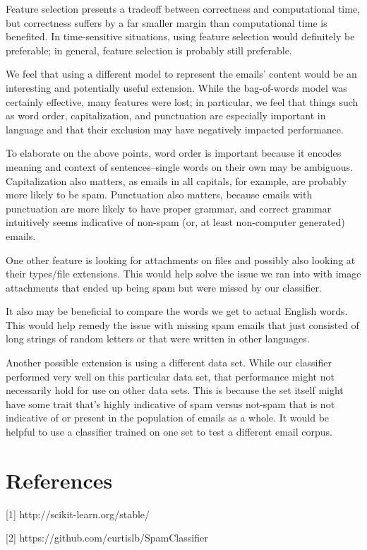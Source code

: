 \documentclass{article} %
\begin{document}
Feature selection presents a tradeoff between correctness and computational time, but correctness suffers by a far smaller margin than computational time is benefited. In time-sensitive situations, using feature selection would definitely be preferable; in general, feature selection is probably still preferable.

We feel that using a different model to represent the emails' content would be an interesting and potentially useful extension. While the bag-of-words model was certainly effective, many features were lost; in particular, we feel that things such as word order, capitalization, and punctuation are especially important in language and that their exclusion may have negatively impacted performance. 

To elaborate on the above points, word order is important because it encodes meaning and context of sentences--single words on their own may be ambiguous. Capitalization also matters, as emails in all capitals, for example, are probably more likely to be spam. Punctuation also matters, because emails with punctuation are more likely to have proper grammar, and correct grammar intuitively seems indicative of non-spam (or, at least non-computer generated) emails. 

One other feature is looking for attachments on files and possibly also looking at their types/file extensions. This would help solve the issue we ran into with image attachments that ended up being spam but were missed by our classifier. 

It also may be beneficial to compare the words we get to actual English words. This would help remedy the issue with missing spam emails that just consisted of long strings of random letters or that were written in other languages. 

Another possible extension is using a different data set. While our classifier performed very well on this particular data set, that performance might not necessarily hold for use on other data sets. This is because the set itself might have some trait that's highly indicative of spam versus not-spam that is not indicative of or present in the population of emails as a whole. It would be helpful to use a classifier trained on one set to test a different email corpus. 

\section{References}

[1] http://scikit-learn.org/stable/

[2] https://github.com/curtislb/SpamClassifier
\end{document}
